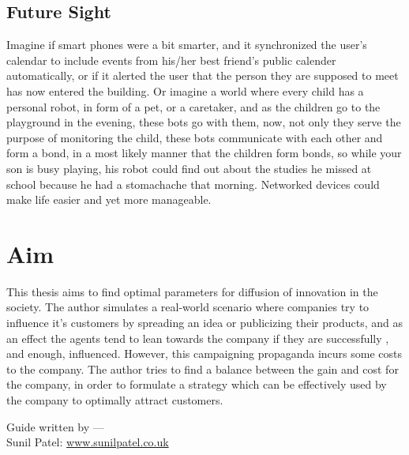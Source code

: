 \subsection{Future Sight}

Imagine if smart phones were a bit smarter, and it synchronized the user's calendar to include events from his/her best friend's public calender automatically, or if it alerted the user that the person they are supposed to meet has now entered the building.
Or imagine a world where every child has a personal robot, in form of a pet, or a caretaker, and as the children go to the playground in the evening, these bots go with them, now, not only they serve the purpose of monitoring the child, these bots communicate with each other and form a bond, in a most likely manner that the children form bonds, so while your son is busy playing, his robot could find out about the studies he missed at school because he had a stomachache that morning.
Networked devices could make life easier and yet more manageable.
	
\section{Aim}
This thesis aims to find optimal parameters for diffusion of innovation in the society. 
The author simulates a real-world scenario where companies try to influence it's customers by spreading an idea or publicizing their products, and as an effect the agents tend to lean towards the company if they are successfully , and enough, influenced.
However, this campaigning propaganda incurs some costs to the company. The author tries to find a balance between the gain and cost for the company, in order to formulate a strategy which can be effectively used by the company to optimally attract customers. 

\begin{flushright}
Guide written by ---\\
Sunil Patel: \href{http://www.sunilpatel.co.uk}{www.sunilpatel.co.uk}
\end{flushright}
